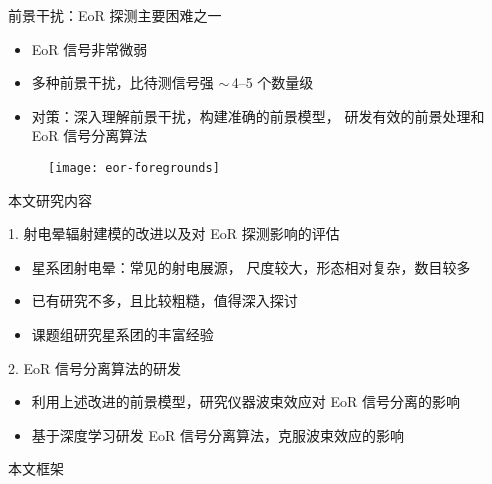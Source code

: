 \documentclass{beamer}
\begin{document}
\begin{frame}{前景干扰：EoR 探测主要困难之一}
  \begin{itemize}
    \item EoR 信号非常微弱
    \item \alert{多种前景干扰}，比待测信号强 $\sim$\,4--5 个数量级
    \item \alert{对策}：深入理解前景干扰，构建准确的前景模型，
      研发有效的前景处理和 EoR 信号分离算法
  \end{itemize}

  \vspace{-1ex}
  \begin{figure}
    \centering
    \texttt{[image: eor-foregrounds]}
  \end{figure}

\end{frame}

\begin{frame}{本文研究内容}
  \begin{alertblock}{1. 射电晕辐射建模的改进以及对 EoR 探测影响的评估}
    \begin{itemize}
      \item 星系团射电晕：常见的射电展源，
        尺度较大，形态相对复杂，数目较多
      \item 已有研究不多，且比较粗糙，值得深入探讨
      \item 课题组研究星系团的丰富经验
    \end{itemize}
  \end{alertblock}

  \begin{alertblock}{2. EoR 信号分离算法的研发}
    \begin{itemize}
      \item 利用上述改进的前景模型，研究仪器波束效应对 EoR 信号分离的影响
      \item 基于深度学习研发 EoR 信号分离算法，克服波束效应的影响
    \end{itemize}
  \end{alertblock}
\end{frame}

\begin{frame}{本文框架}
  \begin{figure}
  \end{figure}
\end{frame}
\end{document}
